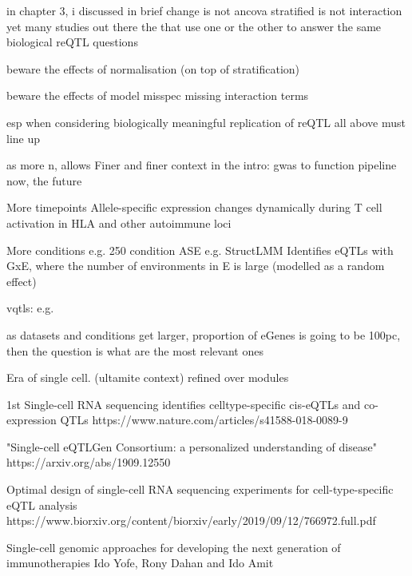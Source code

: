 \begin{outline}
            in chapter 3, i discussed in brief
                change is not ancova
                stratified is not interaction
                yet many studies out there the that use one or the other to answer the same biological reQTL questions

        beware the effects of normalisation (on top of stratification)

        beware the effects of model misspec
            missing interaction terms

        esp when considering biologically meaningful replication of reQTL
            all above must line up

as more n, allows
Finer and finer context
    in the intro: gwas to function pipeline
    now, the future

    More timepoints
    Allele-specific expression changes dynamically during T cell activation in HLA and other autoimmune loci

    More conditions
    e.g. 250 condition ASE %
    e.g. StructLMM 
        Identifies eQTLs with GxE, where the number of environments in E is large (modelled as a random effect)

        vqtls: e.g. %

    as datasets and conditions get larger, proportion of eGenes is going to be 100pc, then the question is what are the most relevant ones

    Era of single cell. (ultamite context)
        refined over modules
        
        1st
        Single-cell RNA sequencing identifies celltype-specific cis-eQTLs and co-expression QTLs
        https://www.nature.com/articles/s41588-018-0089-9

        "Single-cell eQTLGen Consortium: a personalized understanding of disease"
        https://arxiv.org/abs/1909.12550

        Optimal design of single-cell RNA sequencing experiments for cell-type-specific eQTL analysis
        https://www.biorxiv.org/content/biorxiv/early/2019/09/12/766972.full.pdf

        Single-cell genomic approaches for developing the next generation of immunotherapies Ido Yofe, Rony Dahan and Ido Amit


\end{outline}
